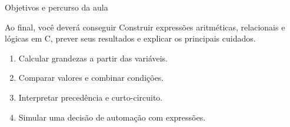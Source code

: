 \begin{frame}{Objetivos e percurso da aula}
\begin{block}{Ao final, você deverá conseguir}
Construir expressões aritméticas, relacionais e lógicas em C, prever seus resultados e explicar os principais cuidados.
\end{block}
\begin{enumerate}
\item Calcular grandezas a partir das variáveis.
\item Comparar valores e combinar condições.
\item Interpretar precedência e curto-circuito.
\item Simular uma decisão de automação com expressões.
\end{enumerate}
\end{frame}
